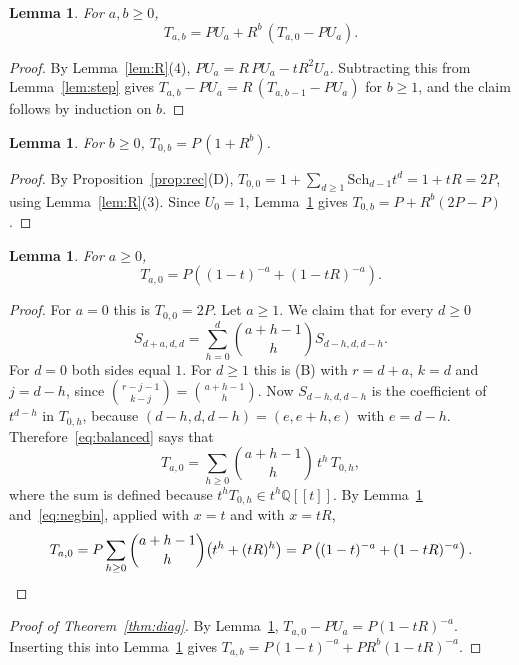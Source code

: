 \documentclass{amsart}
\newtheorem{lemma}[theorem]{Lemma}
\theoremstyle{definition}
\theoremstyle{remark}
\numberwithin{equation}{section}
\newcommand{\Q}{\mathbb{Q}}
\newcommand{\Sch}{\mathrm{Sch}}
\begin{document}
\begin{lemma}\label{lem:induct}
For $a,b\ge0$,
\[
T_{a,b}=PU_a+R^b\,(T_{a,0}-PU_a).
\]
\end{lemma}

\begin{proof}
By Lemma~\ref{lem:R}(4), $PU_a=R\,PU_a-tR^2U_a$. Subtracting this from Lemma~\ref{lem:step} gives $T_{a,b}-PU_a=R\,(T_{a,b-1}-PU_a)$ for $b\ge1$, and the claim follows by induction on $b$.
\end{proof}

\begin{lemma}\label{lem:row}
For $b\ge0$, $T_{0,b}=P\,(1+R^b)$.
\end{lemma}

\begin{proof}
By Proposition~\ref{prop:rec}(D), $T_{0,0}=1+\sum_{d\ge1}\Sch_{d-1}t^d=1+tR=2P$, using Lemma~\ref{lem:R}(3). Since $U_0=1$, Lemma~\ref{lem:induct} gives $T_{0,b}=P+R^b(2P-P)$.
\end{proof}

\begin{lemma}\label{lem:col}
For $a\ge0$,
\[
T_{a,0}=P\left((1-t)^{-a}+(1-tR)^{-a}\right).
\]
\end{lemma}

\begin{proof}
For $a=0$ this is $T_{0,0}=2P$. Let $a\ge1$. We claim that for every $d\ge0$
\begin{equation}\label{eq:balanced}
S_{d+a,d,d}=\sum_{h=0}^{d}\binom{a+h-1}{h}S_{d-h,d,d-h}.
\end{equation}
For $d=0$ both sides equal $1$. For $d\ge1$ this is (B) with $r=d+a$, $k=d$ and $j=d-h$, since $\binom{r-j-1}{k-j}=\binom{a+h-1}{h}$. Now $S_{d-h,d,d-h}$ is the coefficient of $t^{d-h}$ in $T_{0,h}$, because $(d-h,d,d-h)=(e,e+h,e)$ with $e=d-h$. Therefore~\eqref{eq:balanced} says that
\[
T_{a,0}=\sum_{h\ge0}\binom{a+h-1}{h}\,t^h\,T_{0,h},
\]
where the sum is defined because $t^hT_{0,h}\in t^h\Q[[t]]$. By Lemma~\ref{lem:row} and~\eqref{eq:negbin}, applied with $x=t$ and with $x=tR$,
\[
T_{a,0}=P\sum_{h\ge0}\binom{a+h-1}{h}\bigl(t^h+(tR)^h\bigr)=P\left((1-t)^{-a}+(1-tR)^{-a}\right).\qedhere
\]
\end{proof}

\begin{proof}[Proof of Theorem~\ref{thm:diag}]
By Lemma~\ref{lem:col}, $T_{a,0}-PU_a=P(1-tR)^{-a}$. Inserting this into Lemma~\ref{lem:induct} gives $T_{a,b}=P(1-t)^{-a}+PR^b(1-tR)^{-a}$.
\end{proof}
\end{document}
